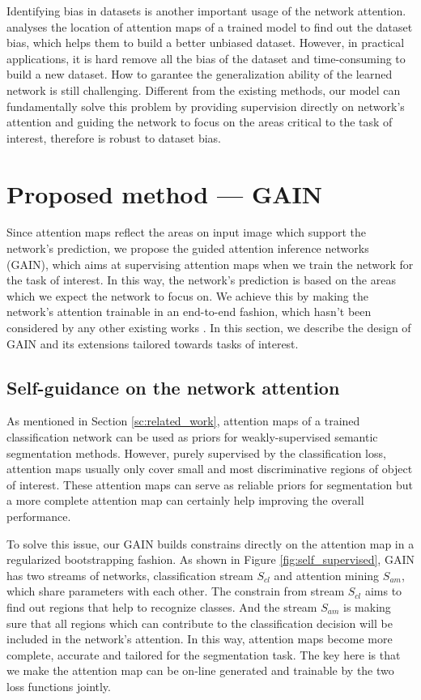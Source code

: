 \documentclass[10pt,twocolumn,letterpaper]{article}
\begin{document}
Identifying bias in datasets \cite{torralba2011unbiased} is another important usage of the network attention. \cite{grad-cam} analyses the location of attention maps of a trained model to find out the dataset bias, which helps them to build a better unbiased dataset. However, in practical applications, it is hard remove all the bias of the dataset and time-consuming to build a new dataset. How to garantee the generalization ability of the learned network is still challenging. Different from the existing methods, our model can fundamentally solve this problem by providing supervision directly on network's attention and guiding the network to focus on the areas critical to the task of interest, therefore is robust to dataset bias.


\section{Proposed method --- GAIN}

Since attention maps reflect the areas on input image which support the network's prediction, we propose the guided attention inference networks (GAIN), which aims at supervising attention maps when we train the network for the task of interest. In this way, the network's prediction is based on the areas which we expect the network to focus on. We achieve this by making the network's attention trainable in an end-to-end fashion, which hasn't been considered by any other existing works \cite{grad-cam,zhou2016learning,wei2017object,zhang2016top,singh2017hide,kim2017two}. In this section, we describe the design of GAIN and its extensions tailored towards tasks of interest.




\subsection{Self-guidance on the network attention} \label{section:method_self}

As mentioned in Section \ref{sc:related_work}, attention maps of a trained classification network can be used as priors for weakly-supervised semantic segmentation methods. However, purely supervised by the classification loss, attention maps usually only cover small and most discriminative regions of object of interest. These attention maps can serve as reliable priors for segmentation but a more complete attention map can certainly help improving the overall performance.


To solve this issue, our GAIN builds constrains directly on the attention map in a regularized bootstrapping fashion. As shown in Figure \ref{fig:self_supervised}, GAIN has two streams of networks, classification stream ${S_{cl}}$ and attention mining ${S_{am}}$, which share parameters with each other. The constrain from stream ${S_{cl}}$ aims to find out regions that help to recognize classes. And the stream ${S_{am}}$ is making sure that all regions which can contribute to the classification decision will be included in the network's attention. In this way, attention maps become more complete, accurate and tailored for the segmentation task. The key here is that we make the attention map can be on-line generated and trainable by the two loss functions jointly.
\end{document}
